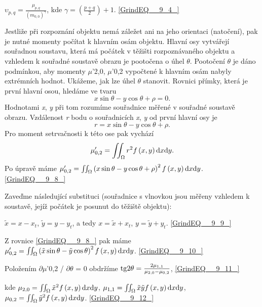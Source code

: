  $\upsilon _{p,q} =\frac{\mu _{p,q} }{\left(m_{0,0} \right)^{\gamma } } $,   kde   $\gamma =\left(\frac{p+q}{2} \right)+1$. \eqref{GrindEQ__9_4_}

\noindent Jestliže při rozpoznání objektu nemá záležet ani na jeho orientaci (natočení), pak je nutné momenty počítat k hlavním osám objektu. Hlavní osy vytvářejí souřadnou soustavu, která má počátek v těžišti rozpoznávaného objektu a vzhledem k souřadné soustavě obrazu je pootočena o úhel $\theta$. Pootočení $\theta$ je dáno podmínkou, aby momenty $\mu$'2,0, $\mu$'0,2 vypočtené k hlavním osám nabyly extrémních hodnot. Ukážeme, jak lze úhel $\theta$ stanovit. Rovnici přímky, která je první hlavní osou, hledáme ve tvaru  
\begin{equation} \label{GrindEQ__9_5_} 
x\sin \theta -y\cos \theta +\rho =0.  
\end{equation} 
Hodnotami \textit{x}, \textit{y} při tom rozumíme souřadnice měřené v souřadné soustavě obrazu. Vzdálenost \textit{r} bodu o souřadnicích \textit{x}, \textit{y} od první hlavní osy je 
\begin{equation} \label{GrindEQ__9_6_} 
r=x\sin \theta -y\cos \theta +\rho .  
\end{equation} 
Pro moment setrvačnosti k této ose pak vychází
\begin{equation} \label{GrindEQ__9_7_} 
\mu '_{0,2} =\iint \nolimits _{\Omega }r^{2} f\left(x,y\right){\rm d}x{\rm d}y .  
\end{equation} 
Po úpravě máme $\mu '_{0,2} =\iint \nolimits _{\Omega }\left(x\sin \theta -y\cos \theta +\rho \right)^{2} f\left(x,y\right){\rm d}x{\rm d}y $. \eqref{GrindEQ__9_8_}

\noindent Zaveďme následující substituci (souřadnice s vlnovkou jsou měřeny vzhledem k soustavě, jejíž počátek je posunut do těžiště objektu):

 $\tilde{x}=x-x_{t} $,   $\tilde{y}=y-y_{t} $,    a tedy    $x=\tilde{x}+x_{t} $,   $y=\tilde{y}+y_{t} $. \eqref{GrindEQ__9_9_}

\noindent Z rovnice \eqref{GrindEQ__9_8_} pak máme $\mu '_{0,2} =\iint \nolimits _{\Omega }\left(\tilde{x}\sin \theta -\tilde{y}\cos \theta \right)^{2} f\left(x,y\right){\rm d}x{\rm d}y $. \eqref{GrindEQ__9_10_}

\noindent Položením $\partial$$\mu$'0,2 / $\partial$$\theta$ = 0 obdržíme ${\rm tg}2\theta =\frac{2\mu _{1,1} }{\mu _{2,0} -\mu _{0,2} } $, \eqref{GrindEQ__9_11_}

\noindent kde $\mu _{2,0} =\iint \nolimits _{\Omega }\tilde{x}^{2} f\left(x,y\right){\rm d}x{\rm d}y $,     $\mu _{1,1} =\iint \nolimits _{\Omega }\tilde{x}\tilde{y}f\left(x,y\right){\rm d}x{\rm d}y $,     $\mu _{0,2} =\iint \nolimits _{\Omega }\tilde{y}^{2} f\left(x,y\right){\rm d}x{\rm d}y $. \eqref{GrindEQ__9_12_}

